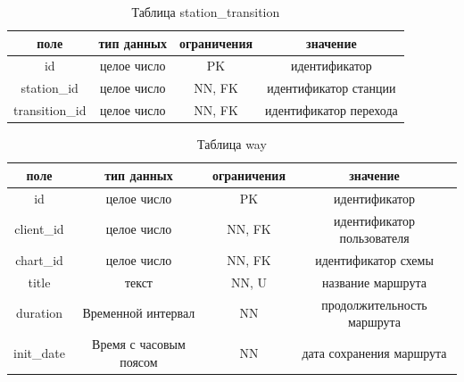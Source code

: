\begin{table}[H]
    \begin{center}
        \caption{Таблица station\_transition}
        \label{tbl:branch_transition}
        \begin{tabular}{|c|c|c|c|}
            \hline
            поле & тип данных & ограничения & значение \\
            \hline
            id & целое число & PK & идентификатор \\
            \hline
            station\_id & целое число & NN, FK & идентификатор станции \\
            \hline
            transition\_id & целое число & NN, FK & идентификатор перехода \\
            \hline
        \end{tabular}
    \end{center}    
\end{table}

\begin{table}[H]
    \begin{center}
        \caption{Таблица way}
        \label{tbl:way}
        \begin{tabular}{|c|c|c|c|}
            \hline
            поле & тип данных & ограничения & значение \\
            \hline
            id & целое число & PK & идентификатор \\
            \hline
            client\_id & целое число & NN, FK & идентификатор пользователя \\
            \hline
            chart\_id & целое число & NN, FK & идентификатор схемы \\
            \hline
            title & текст & NN, U & название маршрута \\
            \hline
            duration & Временной интервал & NN & продолжительность маршрута \\
            \hline
            init\_date & Время с часовым поясом & NN & дата сохранения маршрута \\
            \hline
        \end{tabular}
    \end{center}    
\end{table}

